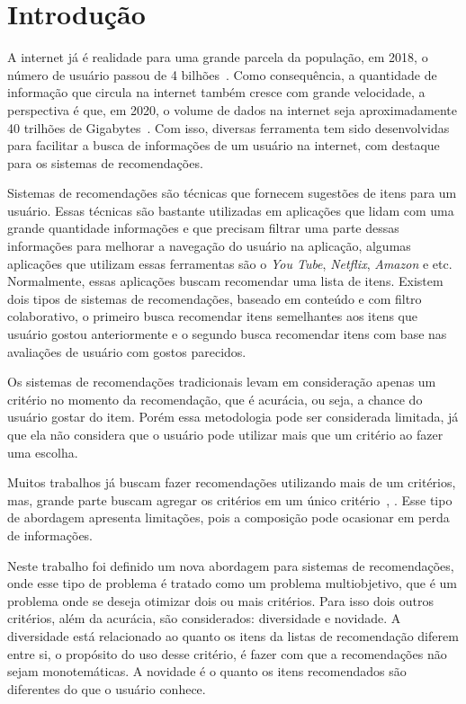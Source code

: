 \chapter{Introdução}
A internet já é realidade para uma grande parcela da população, em 2018, o número de usuário passou de 4 bilhões~\cite{internetusers}. Como consequência, a quantidade de informação que circula na internet também cresce com grande velocidade, a perspectiva é que, em 2020, o volume de dados na internet seja aproximadamente 40 trilhões de Gigabytes~\cite{volumedados}. Com isso, diversas ferramenta tem sido desenvolvidas para facilitar a busca de informações de um usuário na internet, com destaque para os sistemas de recomendações.

Sistemas de recomendações são técnicas que fornecem sugestões de itens para um usuário\cite{ricci2011introduction}. Essas técnicas são bastante utilizadas em aplicações que lidam com uma grande quantidade informações e que precisam filtrar uma parte dessas informações para melhorar a navegação do usuário na aplicação, algumas aplicações que utilizam essas ferramentas são o \textit{You Tube}, \textit{Netflix}, \textit{Amazon} e etc. Normalmente, essas aplicações buscam recomendar uma lista de itens. Existem dois tipos de sistemas de recomendações, baseado em conteúdo e com filtro colaborativo, o primeiro busca recomendar itens semelhantes aos itens que usuário gostou anteriormente e o segundo busca recomendar itens com base nas avaliações de usuário com gostos parecidos.

Os sistemas de recomendações tradicionais levam em consideração apenas um critério no momento da recomendação, que é acurácia, ou seja, a chance do usuário gostar do item. Porém essa metodologia pode ser considerada limitada, já que ela não considera que o usuário pode utilizar mais que um critério ao fazer uma escolha\cite{adomavicius2011multi}. 

Muitos trabalhos já buscam fazer recomendações utilizando mais de um critérios, mas, grande parte buscam agregar os critérios em um único critério~\cite{yager1988ordered}, \cite{kaymak1994selecting}. Esse tipo de abordagem apresenta limitações, pois a composição pode ocasionar em perda de informações.

Neste trabalho  foi definido um nova abordagem para sistemas de recomendações, onde esse tipo de problema é tratado como um problema multiobjetivo, que é um problema onde se deseja otimizar dois ou mais critérios. Para isso dois outros critérios, além da acurácia, são considerados: diversidade e novidade. A diversidade está relacionado ao quanto os itens da listas de recomendação diferem entre si, o propósito do uso desse critério, é fazer com que a recomendações não sejam monotemáticas\cite{hurley2011novelty}. A novidade é o quanto os itens recomendados são diferentes do que o usuário conhece\cite{hurley2011novelty}. 


